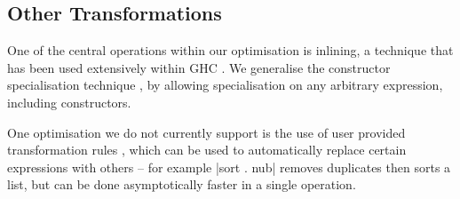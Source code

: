 \subsection{Other Transformations}

One of the central operations within our optimisation is inlining, a technique that has been used extensively within GHC \cite{spj:inlining}. We generalise the constructor specialisation technique \cite{spj:specconstr}, by allowing specialisation on any arbitrary expression, including constructors.

One optimisation we do not currently support is the use of user provided transformation rules \cite{spj:rules}, which can be used to automatically replace certain expressions with others -- for example |sort . nub| removes duplicates then sorts a list, but can be done asymptotically faster in a single operation.

